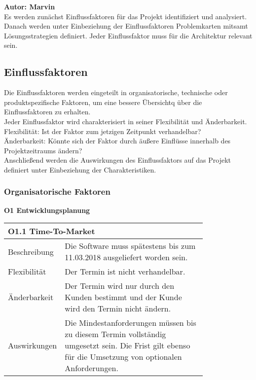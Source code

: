 \textbf{Autor: Marvin}\\
{Es werden zunächst Einflussfaktoren für das Projekt identifiziert und analysiert. Danach werden unter Einbeziehung der Einflussfaktoren Problemkarten mitsamt Lösungsstrategien definiert. Jeder Einflussfaktor muss für die Architektur relevant sein.}
\subsection{Einflussfaktoren} \label{sec:einflussfaktoren}
{Die Einflussfaktoren werden eingeteilt in organisatorische, technische oder produktspezifische Faktoren, um eine bessere Übersichtq über die Einflussfaktoren zu erhalten.\\
Jeder Einflussfaktor wird charakterisiert in seiner Flexibilität und Änderbarkeit.\\
Flexibilität: Ist der Faktor zum jetzigen Zeitpunkt verhandelbar?\\
Änderbarkeit: Könnte sich der Faktor durch äußere Einflüsse innerhalb des Projektzeitraums ändern?\\
Anschließend werden die Auswirkungen des Einflussfaktors auf das Projekt definiert unter Einbeziehung der Charakteristiken.

\subsubsection{Organisatorische Faktoren}

\textbf{O1 Entwicklungsplanung}

\begin{table}[htbp]
\centering
\begin{tabular}{|l|p{0.8\linewidth}|}
\hline
\multicolumn{2}{|l|}{\textbf{O1.1 Time-To-Market}}
  \tabularnewline \hline
Beschreibung                                               &  Die Software muss spätestens bis zum 11.03.2018 ausgeliefert worden sein.                                                   \tabularnewline \hline
Flexibilität                                              & Der Termin ist nicht verhandelbar.                                                                                \tabularnewline \hline
Änderbarkeit                                         & Der Termin wird nur durch den Kunden bestimmt und der Kunde wird den Termin  nicht ändern.                                                                 \tabularnewline \hline
Auswirkungen                                                & Die Mindestanforderungen müssen bis zu diesem Termin vollständig umgesetzt sein. Die Frist gilt ebenso für die Umsetzung von optionalen Anforderungen.                                         \tabularnewline \hline
 \hline
\end{tabular}
\end{table}

}
